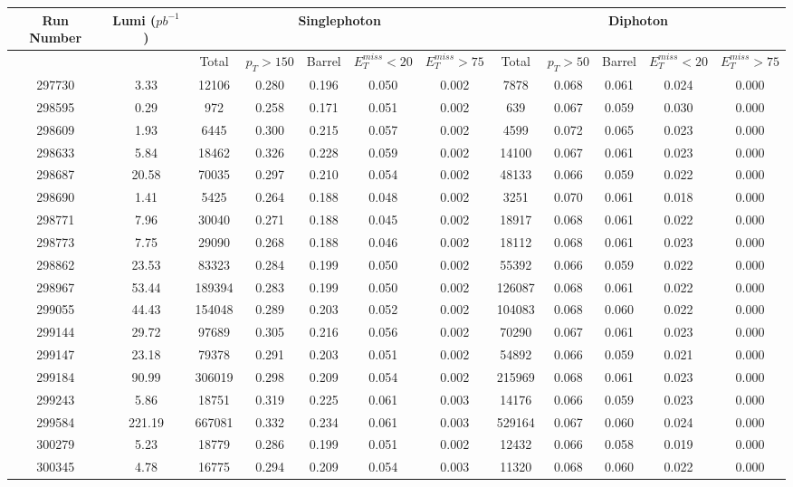 \documentclass[10pt]{extarticle}
\begin{document}
\begin{longtable}{|c|c|c|c|c|c|c|c|c|c|c|c|}
\hline 
Run Number & Lumi ($pb^{-1}$) & \multicolumn{5}{|c|}{Singlephoton} & \multicolumn{5}{|c|}{Diphoton} \\ 
\hline 
 & & Total & $p_{T} > 150$ & Barrel & $E_{T}^{miss} < 20$ & $E_{T}^{miss} > 75$ & Total & $p_{T} > 50$ & Barrel & $E_{T}^{miss} < 20$ & $E_{T}^{miss} > 75$ \\ 
\hline 
297730&3.33&12106&0.280&0.196&0.050&0.002&7878&0.068&0.061&0.024&0.000 \\ 
\hline 
298595&0.29&972&0.258&0.171&0.051&0.002&639&0.067&0.059&0.030&0.000 \\ 
\hline 
298609&1.93&6445&0.300&0.215&0.057&0.002&4599&0.072&0.065&0.023&0.000 \\ 
\hline 
298633&5.84&18462&0.326&0.228&0.059&0.002&14100&0.067&0.061&0.023&0.000 \\ 
\hline 
298687&20.58&70035&0.297&0.210&0.054&0.002&48133&0.066&0.059&0.022&0.000 \\ 
\hline 
298690&1.41&5425&0.264&0.188&0.048&0.002&3251&0.070&0.061&0.018&0.000 \\ 
\hline 
298771&7.96&30040&0.271&0.188&0.045&0.002&18917&0.068&0.061&0.022&0.000 \\ 
\hline 
298773&7.75&29090&0.268&0.188&0.046&0.002&18112&0.068&0.061&0.023&0.000 \\ 
\hline 
298862&23.53&83323&0.284&0.199&0.050&0.002&55392&0.066&0.059&0.022&0.000 \\ 
\hline 
298967&53.44&189394&0.283&0.199&0.050&0.002&126087&0.068&0.061&0.022&0.000 \\ 
\hline 
299055&44.43&154048&0.289&0.203&0.052&0.002&104083&0.068&0.060&0.022&0.000 \\ 
\hline 
299144&29.72&97689&0.305&0.216&0.056&0.002&70290&0.067&0.061&0.023&0.000 \\ 
\hline 
299147&23.18&79378&0.291&0.203&0.051&0.002&54892&0.066&0.059&0.021&0.000 \\ 
\hline 
299184&90.99&306019&0.298&0.209&0.054&0.002&215969&0.068&0.061&0.023&0.000 \\ 
\hline 
299243&5.86&18751&0.319&0.225&0.061&0.003&14176&0.066&0.059&0.023&0.000 \\ 
\hline 
299584&221.19&667081&0.332&0.234&0.061&0.003&529164&0.067&0.060&0.024&0.000 \\ 
\hline 
300279&5.23&18779&0.286&0.199&0.051&0.002&12432&0.066&0.058&0.019&0.000 \\ 
\hline 
300345&4.78&16775&0.294&0.209&0.054&0.003&11320&0.068&0.060&0.022&0.000 \\ 

\end{longtable}
\end{document}
